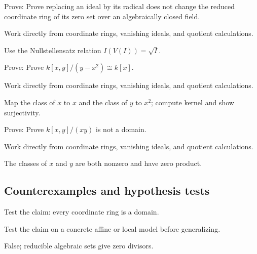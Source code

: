 \begin{exercise}\label{exr:vi03-expand-07}
Prove: Prove replacing an ideal by its radical does not change the reduced coordinate ring of its zero set over an algebraically closed field.
\end{exercise}
\begin{hint}
Work directly from coordinate rings, vanishing ideals, and quotient calculations.
\end{hint}
\begin{solution}
Use the Nullstellensatz relation $I(V(I))=\sqrt I$.
\end{solution}

\begin{exercise}\label{exr:vi03-expand-08}
Prove: Prove $k[x,y]/(y-x^2)\cong k[x]$.
\end{exercise}
\begin{hint}
Work directly from coordinate rings, vanishing ideals, and quotient calculations.
\end{hint}
\begin{solution}
Map the class of $x$ to $x$ and the class of $y$ to $x^2$; compute kernel and show surjectivity.
\end{solution}

\begin{exercise}\label{exr:vi03-expand-09}
Prove: Prove $k[x,y]/(xy)$ is not a domain.
\end{exercise}
\begin{hint}
Work directly from coordinate rings, vanishing ideals, and quotient calculations.
\end{hint}
\begin{solution}
The classes of $x$ and $y$ are both nonzero and have zero product.
\end{solution}

\subsection*{Counterexamples and hypothesis tests}

\begin{exercise}\label{exr:vi03-expand-10}
Test the claim: every coordinate ring is a domain.
\end{exercise}
\begin{hint}
Test the claim on a concrete affine or local model before generalizing.
\end{hint}
\begin{solution}
False; reducible algebraic sets give zero divisors.
\end{solution}

